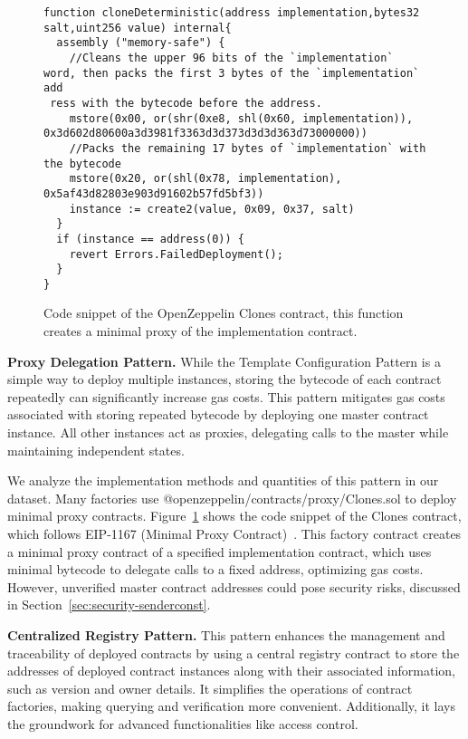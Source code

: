 \documentclass[acmsmall, screen]{acmart}
\begin{document}
	\begin{figure}[h]
		\begin{minipage}{0.95\linewidth}
			\begin{lstlisting}
function cloneDeterministic(address implementation,bytes32 salt,uint256 value) internal{
  assembly ("memory-safe") {
    //Cleans the upper 96 bits of the `implementation` word, then packs the first 3 bytes of the `implementation` add
 ress with the bytecode before the address.
    mstore(0x00, or(shr(0xe8, shl(0x60, implementation)), 0x3d602d80600a3d3981f3363d3d373d3d3d363d73000000))
    //Packs the remaining 17 bytes of `implementation` with the bytecode
    mstore(0x20, or(shl(0x78, implementation), 0x5af43d82803e903d91602b57fd5bf3))
    instance := create2(value, 0x09, 0x37, salt)
  }
  if (instance == address(0)) {
    revert Errors.FailedDeployment();
  }
}
			\end{lstlisting}
		\end{minipage}
		\caption{Code snippet of the OpenZeppelin Clones contract, this function creates a minimal proxy
		of the implementation contract.}
		\label{list:clone}
	\end{figure}

	\textbf{Proxy Delegation Pattern.} \label{sec:proxy-delegation} While the Template Configuration
	Pattern is a simple way to deploy multiple instances, storing the bytecode of each contract repeatedly
	can significantly increase gas costs. This pattern mitigates gas costs associated with storing
	repeated bytecode by deploying one master contract instance. All other instances act as proxies,
	delegating calls to the master while maintaining independent states.

	We analyze the implementation methods and quantities of this pattern in our dataset. Many factories
	use @openzeppelin/contracts/proxy/Clones.sol to deploy minimal proxy contracts. Figure~\ref{list:clone}
	shows the code snippet of the Clones contract, which follows EIP-1167 (Minimal Proxy Contract)~\cite{eip-1167}.
	This factory contract creates a minimal proxy contract of a specified implementation contract, which
	uses minimal bytecode to delegate calls to a fixed address, optimizing gas costs. However,
	unverified master contract addresses could pose security risks, discussed in Section~\ref{sec:security-senderconst}.

	\textbf{Centralized Registry Pattern.} This pattern enhances the management and traceability of
	deployed contracts by using a central registry contract to store the addresses of deployed
	contract instances along with their associated information, such as version and owner details.
	It simplifies the operations of contract factories, making querying and verification more convenient.
	Additionally, it lays the groundwork for advanced functionalities like access control.
\end{document}
